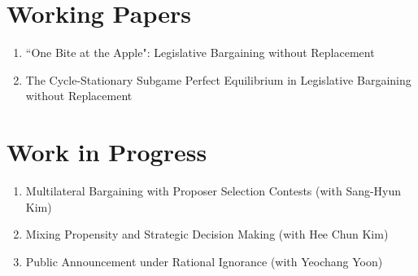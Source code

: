 \documentclass[margin]{res}
\begin{document}
\begin{resume}

\section{Working Papers}
\begin{enumerate}
\item ``One Bite at the Apple": Legislative Bargaining without Replacement
\item The Cycle-Stationary Subgame Perfect Equilibrium in Legislative Bargaining without Replacement
\end{enumerate}

\section{Work in Progress}
\begin{enumerate}
\item Multilateral Bargaining with Proposer Selection Contests (with Sang-Hyun Kim)
\item Mixing Propensity and Strategic Decision Making (with Hee Chun Kim)
\item Public Announcement under Rational Ignorance (with Yeochang Yoon)
\end{enumerate}


\end{resume}
\end{document}
